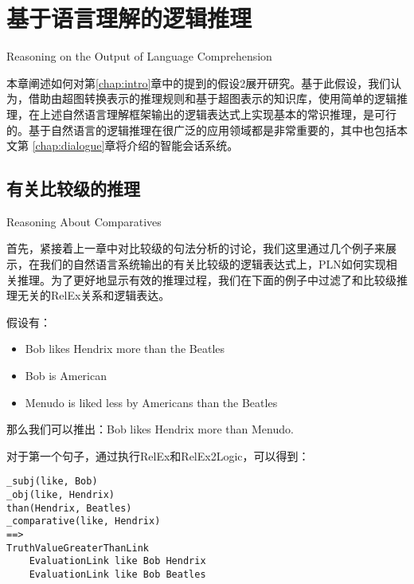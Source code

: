 

\chapter{基于语言理解的逻辑推理}{Reasoning on the Output of Language Comprehension}

本章阐述如何对第\ref{chap:intro}章中的提到的假设2展开研究。基于此假设，我们认为，借助由超图转换表示的推理规则和基于超图表示的知识库，使用简单的逻辑推理，在上述自然语言理解框架输出的逻辑表达式上实现基本的常识推理，是可行的。基于自然语言的逻辑推理在很广泛的应用领域都是非常重要的，其中也包括本文第 \ref{chap:dialogue}章将介绍的智能会话系统。

\section{有关比较级的推理}{Reasoning About Comparatives}

首先，紧接着上一章中对比较级的句法分析的讨论，我们这里通过几个例子来展示，在我们的自然语言系统输出的有关比较级的逻辑表达式上，PLN如何实现相关推理。为了更好地显示有效的推理过程，我们在下面的例子中过滤了和比较级推理无关的RelEx关系和逻辑表达。

假设有：

\begin{itemize}
\item Bob likes Hendrix more than the Beatles
\item Bob is American
\item Menudo is liked less by Americans than the Beatles
\end{itemize}

\noindent 那么我们可以推出：Bob likes Hendrix more than Menudo.

对于第一个句子，通过执行RelEx和RelEx2Logic，可以得到：

 {\tt\begin{small}\begin{lstlisting}
_subj(like, Bob)
_obj(like, Hendrix)
than(Hendrix, Beatles)
_comparative(like, Hendrix)
==>
TruthValueGreaterThanLink
    EvaluationLink like Bob Hendrix
    EvaluationLink like Bob Beatles
\end{lstlisting}\end{small}}

